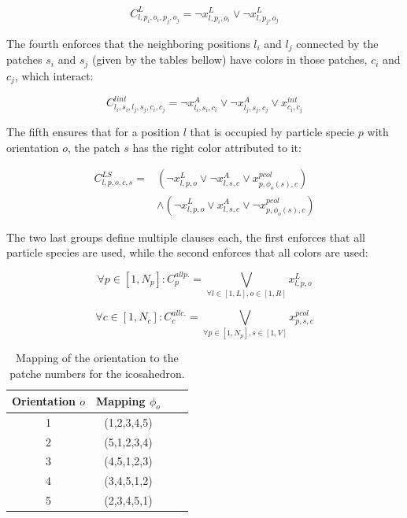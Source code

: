 \documentclass[a4paper, amsfonts, amssymb, amsmath, reprint, showkeys, nofootinbib, oneside]{revtex4-1}
\begin{document}
\begin{equation}
C^{L}_{l,p_i,o_i,p_j,o_j}=\neg x_{l,p_i,o_i}^{L} \vee \neg x_{l,p_j,o_j}^{L}
\end{equation}

The fourth enforces that the neighboring positions $l_i$ and $l_j$ connected by the patches $s_i$ and $s_j$ (given by the tables bellow) have colors in those patches, $c_i$ and $c_j$, which interact:

\begin{equation}
C^{lint}_{l_i,s_i,l_j,s_j,c_i,c_j}=\neg x_{l_i,s_i,c_i}^{A} \vee \neg x_{l_j,s_j,c_j}^{A} \vee x_{c_i,c_j}^{int}
\end{equation}

The fifth ensures that for a position $l$ that is occupied by particle specie $p$ with orientation $o$, the patch $s$ has the right color attributed to it:

\begin{equation}
\begin{split}
C^{LS}_{l,p,o,c,s}= & ( \neg x_{l,p,o}^{L} \vee \neg x_{l,s,c}^{A} \vee x_{p,\phi_o(s), c}^{pcol} ) \\ 
& \wedge ( \neg x_{l,p,o}^{L} \vee x_{l,s,c}^{A} \vee \neg x_{p,\phi_o(s), c}^{pcol} )
\end{split}
\end{equation}

The two last groups define multiple clauses each, the first enforces that all particle species are used, while the second enforces that all colors are used:

\begin{equation}
\forall p\in [1, N_p]:C_p^{all p.}= \underset{\forall l \in [1,L], o\in [1,R]}{\bigvee} x_{l,p,o}^L
\end{equation}

\begin{equation}
\forall c\in [1, N_c]:C_c^{all c.}= \underset{\forall p \in [1,N_p], s\in [1,V]}{\bigvee} x_{p,s,c}^{pcol}
\end{equation}

\begin{table}[h!]
	\begin{center}
		\begin{tabular}{ cccc } 
			\hline
			Orientation $o$ & Mapping $\phi_o$ \\
			\hline
			1 & (1,2,3,4,5) \\ 
			2 & (5,1,2,3,4) \\ 
			3 & (4,5,1,2,3) \\ 
			4 & (3,4,5,1,2) \\
			5 & (2,3,4,5,1) \\
			\hline
		\end{tabular}
		\caption{Mapping of the orientation to the patche numbers for the icosahedron.}
	\end{center}
\end{table}
\end{document}
